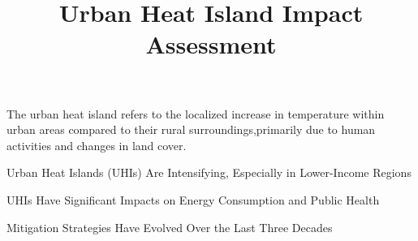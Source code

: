 \documentclass[draft]{agujournal}
\begin{document}
\title{Urban Heat Island Impact Assessment}




\begin{keypoints}
\item The urban heat island refers to the localized increase in temperature within urban areas compared to their rural surroundings,primarily due to human activities and changes in land cover. 
\item Urban Heat Islands (UHIs) Are Intensifying, Especially in Lower-Income Regions
\item UHIs Have Significant Impacts on Energy Consumption and Public Health
\item Mitigation Strategies Have Evolved Over the Last Three Decades
\end{keypoints}
\end{document}
